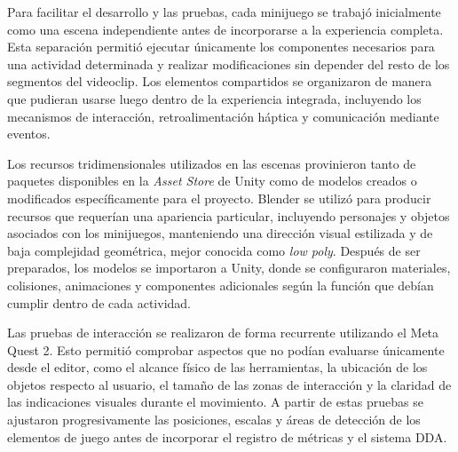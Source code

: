 Para facilitar el desarrollo y las pruebas, cada minijuego se trabajó
inicialmente como una escena independiente antes de incorporarse a la
experiencia completa. Esta separación permitió ejecutar únicamente los
componentes necesarios para una actividad determinada y realizar 
modificaciones sin depender del resto de los segmentos del videoclip.
Los elementos compartidos se organizaron de manera que pudieran usarse
luego dentro de la experiencia integrada, incluyendo los mecanismos de 
interacción, retroalimentación háptica y comunicación mediante eventos.

Los recursos tridimensionales utilizados en las escenas provinieron tanto
de paquetes disponibles en la \textit{Asset Store} de Unity como de 
modelos creados o modificados específicamente para el proyecto. Blender
se utilizó para producir recursos que requerían una apariencia particular,
incluyendo personajes y objetos asociados con los minijuegos, manteniendo
una dirección visual estilizada y de baja complejidad geométrica, mejor
conocida como \textit{low poly}. Después de ser preparados, los modelos se
importaron a Unity, donde se configuraron materiales, colisiones, animaciones
y componentes adicionales según la función que debían cumplir dentro de
cada actividad.

Las pruebas de interacción se realizaron de forma recurrente utilizando
el Meta Quest 2. Esto permitió comprobar aspectos que no podían evaluarse
únicamente desde el editor, como el alcance físico de las herramientas,
la ubicación de los objetos respecto al usuario, el tamaño de las zonas
de interacción y la claridad de las indicaciones visuales durante el movimiento.
A partir de estas pruebas se ajustaron progresivamente las posiciones,
escalas y áreas de detección de los elementos de juego antes de incorporar
el registro de métricas y el sistema DDA.

